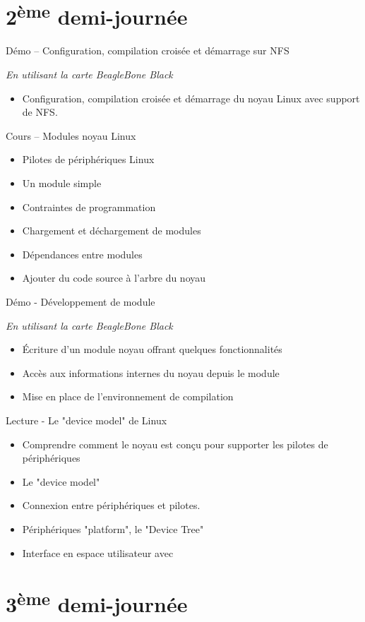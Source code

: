 \documentclass[a4paper,12pt,obeyspaces,spaces,hyphens]{article}
\begin{document}
\section{2\textsuperscript{ème} demi-journée}

\feagendaonecolumn
{Démo – Configuration, compilation croisée et démarrage sur NFS}
{
  {\em En utilisant la carte BeagleBone Black}
  \begin{itemize}
  \item Configuration, compilation croisée et démarrage du noyau Linux
    avec support de NFS.
  \end{itemize}
}

\feagendatwocolumn
{Cours – Modules noyau Linux}
{
  \begin{itemize}
  \item Pilotes de périphériques Linux
  \item Un module simple
  \item Contraintes de programmation
  \item Chargement et déchargement de modules
  \item Dépendances entre modules
  \item Ajouter du code source à l'arbre du noyau
  \end{itemize}
}
{Démo - Développement de module}
{
  {\em En utilisant la carte BeagleBone Black}
  \begin{itemize}
  \item Écriture d'un module noyau offrant quelques fonctionnalités
  \item Accès aux informations internes du noyau depuis le module
  \item Mise en place de l'environnement de compilation
  \end{itemize}
}

\feagendaonecolumn
{Lecture - Le "device model" de Linux}
{
  \begin{itemize}
  \item Comprendre comment le noyau est conçu pour supporter les pilotes
    de périphériques
  \item Le "device model"
  \item Connexion entre périphériques et pilotes.
  \item Périphériques "platform", le "Device Tree"
  \item Interface en espace utilisateur avec 
  \end{itemize}
}

\section{3\textsuperscript{ème} demi-journée}
\end{document}
